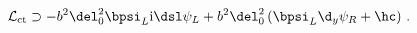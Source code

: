 \begin{equation}
\mathcal{L}_{\mathrm{ct}} \supset -b^2 \del_0^2 \bpsi_L \mathrm{i}
\dsl \psi_L 
+ b^2 \del_0^2 \left( \bpsi_L \d_y \psi_R + \hc \right) \,
. \label{counterterms} 
\end{equation}

